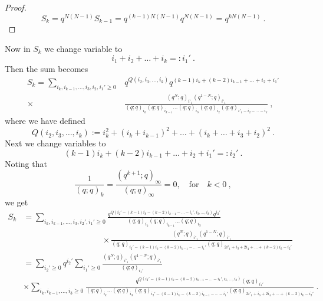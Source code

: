 \documentclass[a4paper,10pt]{article}
\begin{document}
\begin{appendix}
\begin{proof}
\begin{equation}
    S_k=q^{N(N-1)}S_{k-1}=q^{(k-1)N(N-1)}q^{N(N-1)}=q^{kN(N-1)}~.
\end{equation}
\end{proof}
Now in $S_k$ we change variable to  
\begin{equation}
    i_1+i_2+\dots+i_k=:i_1'~.
\end{equation}
Then the sum becomes 
\begin{equation}
\begin{split}
    S_k=\sum_{i_k,i_{k-1},\dots,i_3,i_2,i_1'\geq 0}&q^{Q(i_2,i_3,\dots,i_k)}q^{(k-1)i_k+(k-2)i_{k-1}+\dots+i_2+i_1'}
    \\
    \times&\frac{(q^N;q)_{i'_1}(q^{1-N};q)_{i'_1}}{(q;q)_{i_k}(q;q)_{i_{k-1}}\dots (q;q)_{i_3}(q;q)_{i_2}(q;q)_{i'_1-i_2-\dots-i_k}}~,
\end{split}    
\end{equation}
where we have defined 
\begin{equation}\label{eq:Q_def}
    Q(i_2,i_3,\dots,i_k):=i_k^2+(i_k+i_{k-1})^2+\dots+(i_k+\dots+i_3+i_2)^2~.
\end{equation}
Next we change variables to 
\begin{equation}
    (k-1)i_k+(k-2)i_{k-1}+\dots+i_2+i_1'=:i_2'~.
\end{equation}
Noting that 
\begin{equation}
    \frac{1}{(q;q)_k}=\frac{(q^{k+1};q)_\infty}{(q;q)_\infty}=0,\quad \text{for}\quad k<0~,
\end{equation}
we get 
\begin{equation}
\begin{split}
    S_k&=\sum_{i_k,i_{k-1},\dots,i_3,i_2',i_1'\geq 0}\frac{q^{Q(i_2'-(k-1)i_k-(k-2)i_{k-1}-\dots-i_1',i_3,\dots,i_k)}q^{i_2'}}{(q;q)_{i_k}(q;q)_{i_{k-1}}\dots (q;q)_{i_3}}
    \\
    &\hspace{4cm}\times\frac{(q^N;q)_{i'_1}(q^{1-N};q)_{i'_1}}{(q;q)_{i_2'-(k-1)i_k-(k-2)i_{k-1}-\dots-i_1'}(q;q)_{2i'_1+i_3+2i_4+\dots+(k-2)i_k-i_2'}}
    \\
    &=\sum_{i_2'\geq 0}q^{i_2'}\sum_{i_1'\geq 0}\frac{(q^N;q)_{i'_1}(q^{1-N};q)_{i'_1}}{(q;q)_{i_1'}}
    \\
    &\times\sum_{i_k,i_{k-1},\dots,i_3\geq 0}\frac{q^{Q(i_2'-(k-1)i_k-(k-2)i_{k-1}-\dots-i_1',i_3,\dots,i_k)}(q;q)_{i_1'}}{(q;q)_{i_k}\dots (q;q)_{i_3}(q;q)_{i_2'-(k-1)i_k-(k-2)i_{k-1}-\dots-i_1'}(q;q)_{2i'_1+i_3+2i_4+\dots+(k-2)i_k-i_2'}} ~.
\end{split}      
\end{equation}

\end{appendix}
\end{document}
